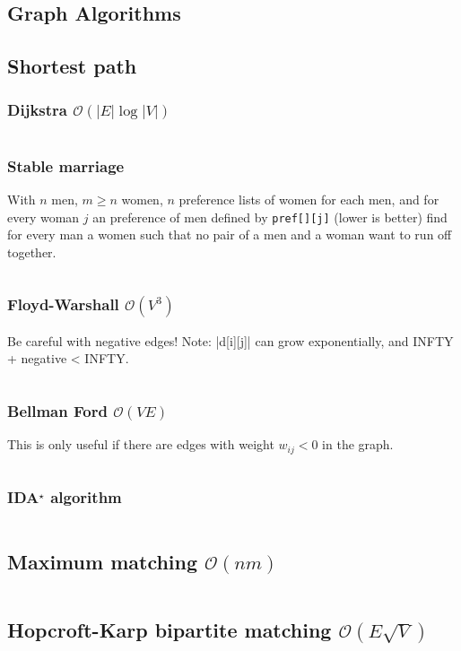 \documentclass[8pt,a4paper,landscape,oneside]{amsart}
\newcommand{\mintedstyle}[2]{\inputminted[fontsize=\normalsize,baselinestretch=.9,breaklines,tabsize=2]{#1}{code/#2}}
\newcommand{\code}[1]{\mintedstyle{cpp}{#1}}
\begin{document}
\begin{multicols*}{3}
\section{Graph Algorithms}

\subsection{Shortest path}

\subsubsection{Dijkstra $\mathcal{O}(|E|\log{|V|})$}
\code{graphs/dijkstra.cpp}

\subsubsection{Stable marriage}
With $n$ men, $m \geq n$ women, $n$ preference lists of women for each men, and
for every woman $j$ an preference of men defined by \texttt{pref[][j]} (lower is better)
find for every man a women such that no pair of a men and a woman want to run off together.
\code{graphs/stable.cpp}

\subsubsection{Floyd-Warshall $\mathcal{O}(V^{3})$}
Be careful with negative edges! Note: |d[i][j]| can grow exponentially, and INFTY + negative < INFTY.
\code{graphs/floydwarshall.cpp}

\subsubsection{Bellman Ford $\mathcal{O}(V E)$}
This is only useful if there are edges with weight $w_{i j} < 0$ in the graph.
\code{graphs/bellmanford.cpp}

\subsubsection{IDA$^\star$ algorithm}
\code{graphs/idastar.cpp}

\subsection{Maximum matching $\mathcal{O}(n m)$}
\code{graphs/maxmatch.cpp}

\subsection{Hopcroft-Karp bipartite matching $\mathcal{O}(E \sqrt{V})$}
\code{graphs/hopcroft_karp.cpp}


\end{multicols*}
\end{document}

